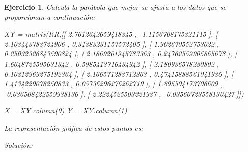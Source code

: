 \documentclass{amsart}
\newtheorem{ejer}{Ejercicio}
\begin{document}
\begin{sagesub}
\begin{center}
\end{center}
\end{sagesub}


\begin{ejer} 
Calcula la parábola que mejor se ajusta a los datos que se proporcionan a continuación:
\begin{sageblock}
XY = matrix(RR,[[ 2.7612642659418345 ,  -1.1156708175321115 ],
                [ 2.103443783724906 ,  0.31383231157572405 ],
                [ 1.902670552753022 ,  0.25032326843590824 ],
                [ 2.1869201945783363 ,  0.24762559905865678 ],
                [ 1.6648725595631342 ,  0.5985413716434942 ],
                [ 2.180936578280802 ,  0.10312969275192364 ],
                [ 2.166571283712363 ,  0.47415888561041936 ],
                [ 1.4134229078250833 ,  0.05736296276262719 ],
                [ 1.895504173706609 ,  -0.036508422559938136 ],
                [ 2.2224525503221937 ,  -0.03560723558130427 ]])

X = XY.column(0)
Y = XY.column(1)
\end{sageblock}

La representación gráfica de estos puntos es:

\begin{sagesub}
\begin{center}
\end{center}
\end{sagesub}


\end{ejer} 

{\it Solución:}
\end{document}
